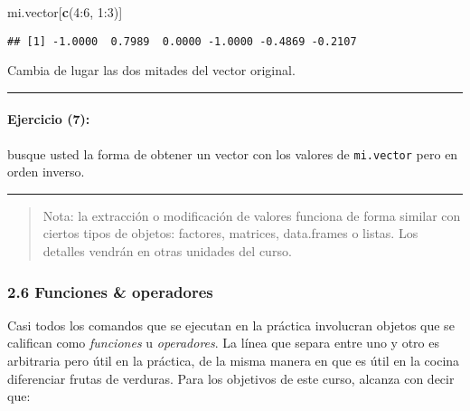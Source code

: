 \documentclass[]{article}
\newenvironment{Shaded}{}{}
\newcommand{\KeywordTok}[1]{\textcolor[rgb]{0.00,0.44,0.13}{\textbf{{#1}}}}
\newcommand{\DecValTok}[1]{\textcolor[rgb]{0.25,0.63,0.44}{{#1}}}
\newcommand{\NormalTok}[1]{{#1}}
\begin{document}
\begin{Shaded}
\begin{Highlighting}[]
\NormalTok{mi.vector[}\KeywordTok{c}\NormalTok{(}\DecValTok{4}\NormalTok{:}\DecValTok{6}\NormalTok{, }\DecValTok{1}\NormalTok{:}\DecValTok{3}\NormalTok{)]}
\end{Highlighting}
\end{Shaded}
\begin{verbatim}
## [1] -1.0000  0.7989  0.0000 -1.0000 -0.4869 -0.2107
\end{verbatim}
Cambia de lugar las dos mitades del vector original.

\begin{center}\rule{3in}{0.4pt}\end{center}

\paragraph{Ejercicio (7):}

busque usted la forma de obtener un vector con los valores de
\texttt{mi.vector} pero en orden inverso.

\begin{center}\rule{3in}{0.4pt}\end{center}

\begin{quote}
Nota: la extracción o modificación de valores funciona de forma similar
con ciertos tipos de objetos: factores, matrices, data.frames o listas.
Los detalles vendrán en otras unidades del curso.

\end{quote}
\subsubsection{2.6 Funciones \& operadores}

Casi todos los comandos que se ejecutan en la práctica involucran
objetos que se califican como \emph{funciones} u \emph{operadores}. La
línea que separa entre uno y otro es arbitraria pero útil en la
práctica, de la misma manera en que es útil en la cocina diferenciar
frutas de verduras. Para los objetivos de este curso, alcanza con decir
que:
\end{document}
